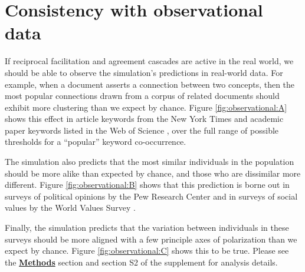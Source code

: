 \documentclass[9pt,twocolumn,twoside,lineno]{pnas-new}
\begin{document}
\section*{Consistency with observational data}
If reciprocal facilitation and agreement cascades are active in the real world, we should be able to observe the simulation’s predictions in real-world data. For example, when a document asserts a connection between two concepts, then the most popular connections drawn from a corpus of related documents should exhibit more clustering than we expect by chance. Figure \ref{fig:observational:A} shows this effect in article keywords from the New York Times \cite{gallina-etal-2019-kptimes} and academic paper keywords listed in the Web of Science \cite{kowsari2017HDLTex}, over the full range of possible thresholds for a ``popular'' keyword co-occurrence. 

The simulation also predicts that the most similar individuals in the population should be more alike than expected by chance, and those who are dissimilar more different. Figure \ref{fig:observational:B} shows that this prediction is borne out in surveys of political opinions by the Pew Research Center \cite{pew2014} and in surveys of social values by the World Values Survey \cite{wvsa2020}. 

Finally, the simulation predicts that the variation between individuals in these surveys should be more aligned with a few principle axes of polarization than we expect by chance. Figure \ref{fig:observational:C} shows this to be true. Please see the \hyperref[methods]{\textbf{Methods}} section and section S2 of the supplement for analysis details.
\end{document}
